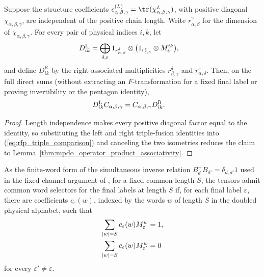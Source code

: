 \begin{lemma}%
    \label{thm:mpdo_triple_fusion_comparison_intertwines}
    \leanok
    Suppose the structure coefficients
    $c^{(L)}_{\alpha,\beta,\gamma}
        =\tr(\chi_{\alpha,\beta,\gamma}^{L})$, with positive diagonal
    $\chi_{\alpha,\beta,\gamma}$, are independent of the positive chain
    length. Write $r_{\alpha,\beta}^{\gamma}$ for the dimension of
    $\chi_{\alpha,\beta,\gamma}$. For every pair of physical indices $i,k$,
    let
    \begin{align}
        D^{\mathrm L}_{ik}
         & =\bigoplus_{\delta,\varepsilon}
        1_{r_{\alpha,\beta}^{\delta}}\otimes
        \bigl(1_{r_{\delta,\gamma}^{\varepsilon}}
        \otimes M_\varepsilon^{ik}\bigr),
        \notag
    \end{align}
    and define $D^{\mathrm R}_{ik}$ by the right-associated multiplicities
    $r_{\beta,\gamma}^{\delta}$ and
    $r_{\alpha,\delta}^{\varepsilon}$. Then, on the full direct sums (without
    extracting an $F$-transformation for a fixed final label or proving
    invertibility or the pentagon identity),
    \begin{align}
        D^{\mathrm L}_{ik}C_{\alpha,\beta,\gamma}
         & =C_{\alpha,\beta,\gamma}D^{\mathrm R}_{ik}.
        \notag
    \end{align}
\end{lemma}
\begin{proof}\leanok
    Length independence makes every positive diagonal factor equal to the
    identity, so substituting the left and right triple-fusion identities into
    (\ref{eq:rfp_triple_comparison}) and canceling the two isometries reduces
    the claim to Lemma~\ref{thm:mpdo_operator_product_associativity}.
\end{proof}

\begin{definition}%
    \label{def:mpdo_final_label_selector_words}
    \leanok
    As the finite-word form of the simultaneous inverse relation
    $B_d^+B_{d'}=\delta_{d,d'}1$ used in the fixed-channel argument of
    \cite{Bultinck2017Anyons}, for a fixed common length $S$, the tensors
    admit common word selectors for the final labels at length $S$ if, for
    each final label $\varepsilon$, there are coefficients $c_\varepsilon(w)$,
    indexed by the words $w$ of length $S$ in the doubled physical alphabet,
    such that
    \begin{align}
        \sum_{|w|=S}c_\varepsilon(w)M_\varepsilon^w
         & =1,
        \notag \\
        \sum_{|w|=S}c_\varepsilon(w)M_{\varepsilon'}^w
         & =0
        \notag
    \end{align}
    for every $\varepsilon'\ne\varepsilon$.
\end{definition}

